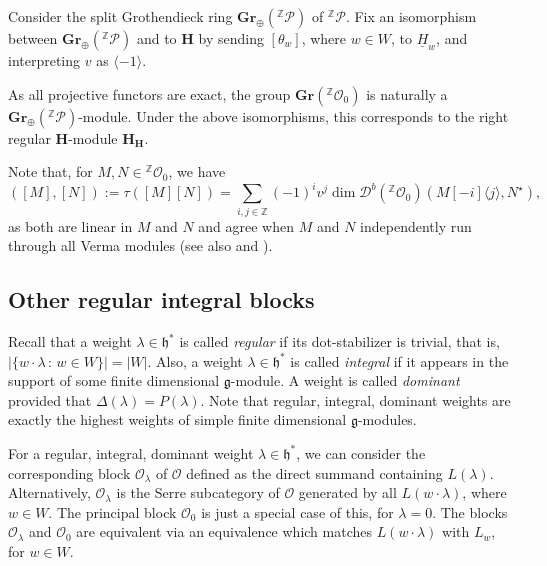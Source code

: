 \documentclass[a4paper]{amsart}
\begin{document}
Consider the split Grothendieck ring
$\mathbf{Gr}_{\oplus}({}^\mathbb{Z}\mathscr{P})$ of 
${}^\mathbb{Z}\mathscr{P}$. Fix an isomorphism between 
$\mathbf{Gr}_{\oplus}({}^\mathbb{Z}\mathscr{P})$ and
to $\mathbf{H}$ by sending $[\theta_w]$, where $w\in W$,
to $\underline{H}_w$, and interpreting $v$ as $\langle -1\rangle$.

As all projective functors are exact, the group 
$\mathbf{Gr}({}^\mathbb{Z}\mathcal{O}_0)$ is naturally
a $\mathbf{Gr}_{\oplus}({}^\mathbb{Z}\mathscr{P})$-module.
Under the above isomorphisms, this corresponds to the right
regular $\mathbf{H}$-module $\mathbf{H}_\mathbf{H}$.

Note that, for $M,N\in {}^\mathbb{Z}\mathcal{O}_0$, we have
\begin{equation}\label{bilinearform}
([M],[N]):=\tau([M][N])=\sum_{i,j\in\mathbb{Z}}
(-1)^iv^j\dim\mathcal{D}^b({}^\mathbb{Z}\mathcal{O}_0)
(M[-i]\langle j\rangle,N^\star),
\end{equation}
as both are linear in $M$ and $N$ and agree when $M$ and $N$ 
independently run through all Verma modules
(see also \cite[Subsection~3.4]{CM} and \cite{KM}).

\subsection{Other regular integral blocks}\label{s1.8}

Recall that a weight $\lambda\in\mathfrak{h}^*$ is called
{\em regular} if its dot-stabilizer is trivial, that is,
$|\{w\cdot \lambda\,:\,w\in W\}|=|W|$. Also, a weight
$\lambda\in\mathfrak{h}^*$ is called {\em integral}
if it appears in the support of some finite dimensional
$\mathfrak{g}$-module. A weight is called {\em dominant}
provided that $\Delta(\lambda)=P(\lambda)$.
Note that regular, integral, dominant weights are
exactly the highest weights of simple finite dimensional
$\mathfrak{g}$-modules.

For a regular, integral, dominant weight $\lambda\in\mathfrak{h}^*$, we
can consider the corresponding block $\mathcal{O}_\lambda$
of $\mathcal{O}$ defined as the direct summand containing 
$L(\lambda)$. Alternatively, $\mathcal{O}_\lambda$ is the 
Serre subcategory of $\mathcal{O}$ generated by all
$L(w\cdot\lambda)$, where $w\in W$. The principal
block $\mathcal{O}_0$ is just a special case of this,
for $\lambda=0$. The blocks 
$\mathcal{O}_\lambda$ and $\mathcal{O}_0$ are equivalent
via an equivalence which matches $L(w\cdot\lambda)$ with
$L_w$, for $w\in W$.
\end{document}
